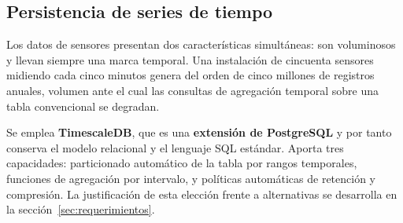 \subsection{Persistencia de series de tiempo}

Los datos de sensores presentan dos características simultáneas: son voluminosos y llevan siempre una
marca temporal. Una instalación de cincuenta sensores midiendo cada cinco minutos genera del orden de
cinco millones de registros anuales, volumen ante el cual las consultas de agregación temporal sobre una
tabla convencional se degradan.

Se emplea \textbf{TimescaleDB}, que es una \textbf{extensión de PostgreSQL} y por tanto conserva el
modelo relacional y el lenguaje SQL estándar. Aporta tres capacidades: particionado automático de la
tabla por rangos temporales, funciones de agregación por intervalo, y políticas automáticas de retención
y compresión. La justificación de esta elección frente a alternativas se desarrolla en la
sección~\ref{sec:requerimientos}.
